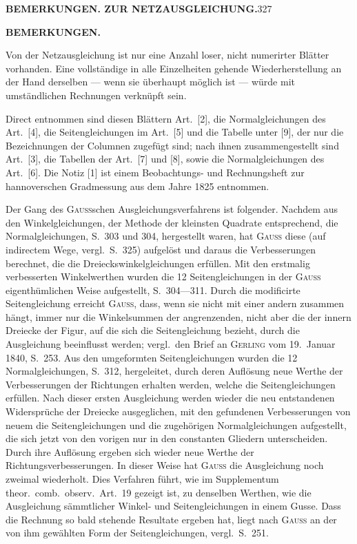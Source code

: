 \noindent\textbf{BEMERKUNGEN. ZUR NETZAUSGLEICHUNG.}\hfill327

\begin{center}\textbf{BEMERKUNGEN.}\end{center}

\par\noindent\hspace*{\parindent}Von der Netzausgleichung ist nur eine Anzahl loser, nicht numerirter Blätter vorhanden.
Eine vollständige in alle Einzelheiten gehende Wiederherstellung an der Hand derselben
--- wenn sie überhaupt möglich ist --- würde mit umständlichen Rechnungen verknüpft sein.

\par\noindent\hspace*{\parindent}Direct entnommen sind diesen Blättern Art.~[2], die Normalgleichungen des Art.~[4],
die Seitengleichungen im Art.~[5] und die Tabelle unter [9], der nur die Bezeichnungen
der Columnen zugefügt sind; nach ihnen zusammengestellt sind Art.~[3], die Tabellen
der Art.~[7] und [8], sowie die Normalgleichungen des Art.~[6]. Die Notiz [1] ist
einem Beobachtungs- und Rechnungsheft zur hannoverschen Gradmessung aus dem Jahre 1825 entnommen.

\par\noindent\hspace*{\parindent}Der Gang des \textsc{Gauss}schen Ausgleichungsverfahrens ist folgender.
Nachdem aus den Winkelgleichungen, der Methode der kleinsten Quadrate entsprechend,
die Normalgleichungen, S.~303 und 304, hergestellt waren, hat \textsc{Gauss} diese
(auf indirectem Wege, vergl.~S.~325) aufgelöst und daraus die Verbesserungen berechnet,
die die Dreieckswinkelgleichungen  erfüllen.
Mit den erstmalig verbesserten Winkelwerthen wurden die 12 Seitengleichungen
in der \textsc{Gauss} eigenthümlichen Weise aufgestellt, S.~304---311.
Durch die modificirte Seitengleichung erreicht \textsc{Gauss}, dass, wenn sie nicht
mit einer andern zusammen hängt, immer nur die Winkelsummen der angrenzenden,
nicht aber die der innern Dreiecke der Figur, auf die sich die Seitengleichung bezieht,
durch die Ausgleichung beeinflusst werden; vergl.~den Brief an \textsc{Gerling}
vom 19.~Januar 1840, S.~253. Aus den umgeformten Seitengleichungen wurden die
12 Normalgleichungen, S.~312, hergeleitet, durch deren Auflösung neue Werthe
der Verbesserungen der Richtungen erhalten werden, welche die Seitengleichungen
 erfüllen. Nach dieser ersten Ausgleichung werden wieder
die neu entstandenen Widersprüche der Dreiecke ausgeglichen, mit den gefundenen
Verbesserungen von neuem die Seitengleichungen und die zugehörigen Normalgleichungen
aufgestellt, die sich jetzt von den vorigen nur in den constanten Gliedern unterscheiden.
Durch ihre Auflösung ergeben sich wieder neue Werthe der Richtungsverbesserungen.
In dieser Weise hat \textsc{Gauss} die Ausgleichung noch zweimal wiederholt.
Dies Verfahren führt, wie im Supplementum theor.~comb.~observ.~Art.~19 gezeigt ist,
zu denselben Werthen, wie die Ausgleichung sämmtlicher Winkel- und Seitengleichungen
in einem Gusse. Dass die Rechnung so bald stehende Resultate ergeben hat,
liegt nach \textsc{Gauss} an der von ihm gewählten Form der Seitengleichungen, vergl.~S.~251.

